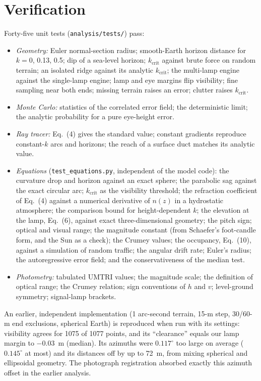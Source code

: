 \documentclass[11pt]{article}
\newcommand{\kc}{k_{\mathrm{crit}}}
\begin{document}
\section{Verification}\label{s:verify}

Forty-five unit tests (\texttt{analysis/tests/}) pass:
\begin{itemize}\itemsep0pt
\item \textit{Geometry:} Euler normal-section radius; smooth-Earth horizon distance for $k=0$, 0.13, 0.5; dip of a sea-level horizon; $\kc$ against brute force on random terrain; an isolated ridge against its analytic $\kc$; the multi-lamp engine against the single-lamp engine; lamp and eye margins flip visibility; fine sampling near both ends; missing terrain raises an error; clutter raises $\kc$.
\item \textit{Monte Carlo:} statistics of the correlated error field; the deterministic limit; the analytic probability for a pure eye-height error.
\item \textit{Ray tracer:} Eq.~(4) gives the standard value; constant gradients reproduce constant-$k$ arcs and horizons; the reach of a surface duct matches its analytic value.
\item \textit{Equations} (\texttt{test\_equations.py}, independent of the model code): the curvature drop and horizon against an exact sphere; the parabolic sag against the exact circular arc; $\kc$ as the visibility threshold; the refraction coefficient of Eq.~(4) against a numerical derivative of $n(z)$ in a hydrostatic atmosphere; the comparison bound for height-dependent $k$; the elevation at the lamp, Eq.~(6), against exact three-dimensional geometry; the pitch sign; optical and visual range; the magnitude constant (from Schaefer's foot-candle form, and the Sun as a check); the Crumey values; the occupancy, Eq.~(10), against a simulation of random traffic; the angular drift rate; Euler's radius; the autoregressive error field; and the conservativeness of the median test.
\item \textit{Photometry:} tabulated UMTRI values; the magnitude scale; the definition of optical range; the Crumey relation; sign conventions of $h$ and $v$; level-ground symmetry; signal-lamp brackets.
\end{itemize}

An earlier, independent implementation (1 arc-second terrain, 15-m step, 30/60-m end exclusions, spherical Earth) is reproduced when run with its settings: visibility agrees for 1075 of 1077 points, and its ``clearance'' equals our lamp margin to $-0.03$~m (median). Its azimuths were $0.117^\circ$ too large on average ($0.145^\circ$ at most) and its distances off by up to 72~m, from mixing spherical and ellipsoidal geometry. The photograph registration absorbed exactly this azimuth offset in the earlier analysis.
\end{document}
